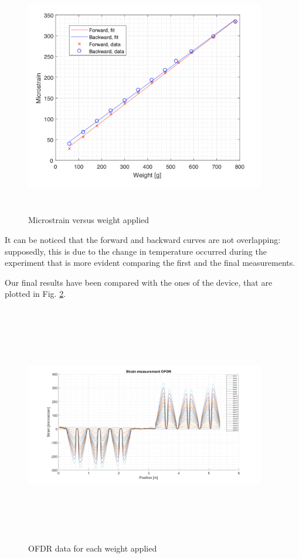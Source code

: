 \begin{figure}[H]
	\centering
	\includegraphics[height=10.5cm, width=10.5cm, keepaspectratio]{img/sensitivity.png}
	\caption{Microstrain versus weight applied}\label{fig:sensitivity}
\end{figure}

It can be noticed that the forward and backward curves are not overlapping: supposedly, this is due to the change in temperature occurred during the experiment that is more evident comparing the first and the final measurements.


Our final results have been compared with the ones of the device, that are plotted in Fig. \ref{fig:OFDR}.

\begin{figure}[H]
	\centering
	\includegraphics[height=10.5cm, width=10.5cm, keepaspectratio]{img/OFDR.png}
	\caption{OFDR data for each weight applied}\label{fig:OFDR}
\end{figure}

